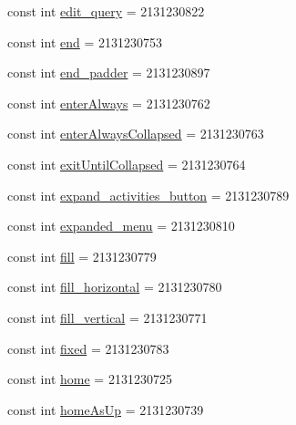 \begin{DoxyCompactItemize}
const int \mbox{\hyperlink{class_f_w_p_s___app_1_1_droid_1_1_resource_1_1_id_a8b13e0008e0d2c7f38a18ff709c8abf5}{edit\+\_\+query}} = 2131230822
\item 
const int \mbox{\hyperlink{class_f_w_p_s___app_1_1_droid_1_1_resource_1_1_id_a43ed69cbe927d7dda64a075d8a6a1c49}{end}} = 2131230753
\item 
const int \mbox{\hyperlink{class_f_w_p_s___app_1_1_droid_1_1_resource_1_1_id_a2ba25d4fbdd965750eac4bbdad78a9f3}{end\+\_\+padder}} = 2131230897
\item 
const int \mbox{\hyperlink{class_f_w_p_s___app_1_1_droid_1_1_resource_1_1_id_a50785f69cc606ffc1d88bf207cf1e9dc}{enter\+Always}} = 2131230762
\item 
const int \mbox{\hyperlink{class_f_w_p_s___app_1_1_droid_1_1_resource_1_1_id_a5d541818fc39ae3ff1d78d95f9bde738}{enter\+Always\+Collapsed}} = 2131230763
\item 
const int \mbox{\hyperlink{class_f_w_p_s___app_1_1_droid_1_1_resource_1_1_id_af1d9902f35869a0b469b3641ae462bab}{exit\+Until\+Collapsed}} = 2131230764
\item 
const int \mbox{\hyperlink{class_f_w_p_s___app_1_1_droid_1_1_resource_1_1_id_a1f492e01d62744ea1e07a2f5f6010113}{expand\+\_\+activities\+\_\+button}} = 2131230789
\item 
const int \mbox{\hyperlink{class_f_w_p_s___app_1_1_droid_1_1_resource_1_1_id_a53ca82b6bc47c3cd1fee49d2fa1307f7}{expanded\+\_\+menu}} = 2131230810
\item 
const int \mbox{\hyperlink{class_f_w_p_s___app_1_1_droid_1_1_resource_1_1_id_a4145eb742b7225e577a117d352f400c2}{fill}} = 2131230779
\item 
const int \mbox{\hyperlink{class_f_w_p_s___app_1_1_droid_1_1_resource_1_1_id_a98e3fb8f6345184a99676746cab78778}{fill\+\_\+horizontal}} = 2131230780
\item 
const int \mbox{\hyperlink{class_f_w_p_s___app_1_1_droid_1_1_resource_1_1_id_a96c42ea4acaf5721e278c5c859a0d51c}{fill\+\_\+vertical}} = 2131230771
\item 
const int \mbox{\hyperlink{class_f_w_p_s___app_1_1_droid_1_1_resource_1_1_id_a0ed7a5afc0f58c9f3a2f8cfe5ab6b719}{fixed}} = 2131230783
\item 
const int \mbox{\hyperlink{class_f_w_p_s___app_1_1_droid_1_1_resource_1_1_id_a4cb78c1004b6c38c4fe019791299e0c8}{home}} = 2131230725
\item 
const int \mbox{\hyperlink{class_f_w_p_s___app_1_1_droid_1_1_resource_1_1_id_a06e7b2d8103259113aba94f7b7614b59}{home\+As\+Up}} = 2131230739

\end{DoxyCompactItemize}
